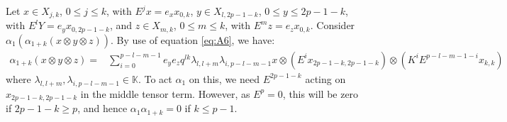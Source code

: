 \documentclass[]{article}
\begin{document}
Let $x\in X_{j,k}$, $0\leq j\leq k$, with $E^{j}x=e_{x}x_{0,k}$, $y\in X_{l,2p-1-k}$, $0\leq y\leq 2p-1-k$, with $E^{l}Y=e_{y}x_{0,2p-1-k}$, and $z\in X_{m,k}$, $0\leq m\leq k$, with $E^{m}z=e_{z}x_{0,k}$. Consider $\alpha_{1}(\alpha_{1+k}(x\otimes y\otimes z))$. By use of equation \ref{eq:A6}, we have:
\begin{align*}
\alpha_{1+k}(x\otimes y\otimes z)=&\sum\limits_{i=0}^{p-l-m-1}e_{y}e_{z}q^{lk}\lambda_{l,l+m}\lambda_{i,p-l-m-1}x\otimes(E^{i}x_{2p-1-k,2p-1-k})\otimes(K^{i}E^{p-l-m-1-i}x_{k,k})
\end{align*}
where $\lambda_{l,l+m},\lambda_{i,p-l-m-1}\in\mathbb{K}$. To act $\alpha_{1}$ on this, we need $E^{2p-1-k}$ acting on $x_{2p-1-k,2p-1-k}$ in the middle tensor term. However, as $E^{p}=0$, this will be zero if $2p-1-k\geq p$, and hence $\alpha_{1}\alpha_{1+k}=0$ if $k\leq p-1$.  
\end{document}
